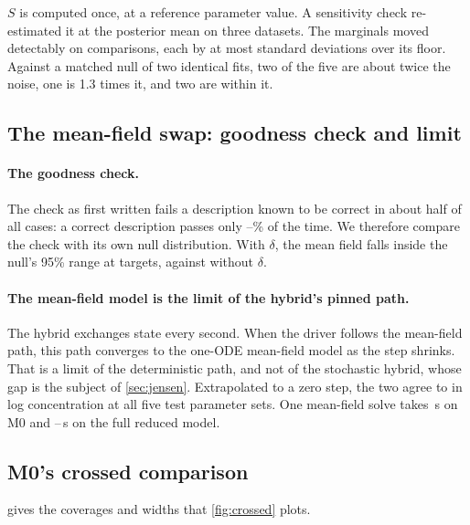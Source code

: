 $S$ is computed once, at a reference parameter value.
A sensitivity check re-estimated it at the posterior mean on three datasets. The
marginals moved detectably on  comparisons, each by at most
 standard deviations over its floor. Against a matched null of two
identical fits, two of the five are about twice the noise, one is 1.3 times it, and
two are within it.

\subsection{The mean-field swap: goodness check and limit}
\label{app:swap}

\paragraph{The goodness check.} The check as first written fails a description known to be correct
in about half of all cases: a correct description passes only
--\% of the time. We therefore compare the check
with its own null distribution. With $\delta$, the mean field falls inside the
null's 95\% range at  targets, against  without
$\delta$.

\paragraph{The mean-field model is the limit of the hybrid's pinned path.} The hybrid exchanges state every second. When the driver follows the mean-field path, this path converges to the one-ODE mean-field model as the step shrinks. That is a limit of the deterministic path, and not of the stochastic hybrid, whose gap is the subject of \cref{sec:jensen}. Extrapolated to a zero step, the two agree to
 in log concentration at all five test parameter sets. One
mean-field solve takes \,s on M0 and --\,s
on the full reduced model.

\subsection{M0's crossed comparison}
\label{app:crossed}

 gives the coverages and widths that \cref{fig:crossed} plots.

